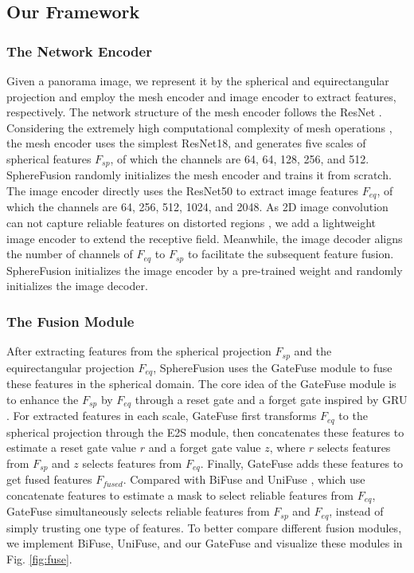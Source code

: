 \subsection{Our Framework}
\label{sec:pipeline}

\subsubsection{The Network Encoder}
Given a panorama image, we represent it by the spherical and equirectangular projection and employ the mesh encoder and image encoder to extract features, respectively.
The network structure of the mesh encoder follows the ResNet \cite{he2016deep}. Considering the extremely high computational complexity of mesh operations \cite{hu2021subdivision,yan2022spheredepth}, the mesh encoder uses the simplest ResNet18, and generates five scales of spherical features $F_{sp}$, of which the channels are 64, 64, 128, 256, and 512. SphereFusion randomly initializes the mesh encoder and trains it from scratch.
The image encoder directly uses the ResNet50 to extract image features $F_{eq}$, of which the channels are 64, 256, 512, 1024, and 2048. 
As 2D image convolution can not capture reliable features on distorted regions \cite{zioulis2018omnidepth}, we add a lightweight image encoder to extend the receptive field. Meanwhile, the image decoder aligns the number of channels of $F_{eq}$ to $F_{sp}$ to facilitate the subsequent feature fusion. SphereFusion initializes the image encoder by a pre-trained weight and randomly initializes the image decoder.





\subsubsection{The Fusion Module}

After extracting features from the spherical projection $F_{sp}$ and the equirectangular projection $F_{eq}$, SphereFusion uses the GateFuse module to fuse these features in the spherical domain. 
The core idea of the GateFuse module is to enhance the $F_{sp}$ by $F_{eq}$ through a reset gate and a forget gate inspired by GRU \cite{cho2014learning}.
For extracted features in each scale, GateFuse first transforms $F_{eq}$ to the spherical projection through the E2S module, then concatenates these features to estimate a reset gate value $r$ and a forget gate value $z$, where $r$ selects features from $F_{sp}$ and $z$ selects features from $F_{eq}$. Finally, GateFuse adds these features to get fused features $F_{fused}$.
Compared with BiFuse \cite{wang2020bifuse} and UniFuse \cite{jiang2021unifuse}, which use concatenate features to estimate a mask to select reliable features from $F_{eq}$, GateFuse simultaneously selects reliable features from $F_{sp}$ and $F_{eq}$, instead of simply trusting one type of features.
To better compare different fusion modules, we implement BiFuse, UniFuse, and our GateFuse and visualize these modules in Fig. \ref{fig:fuse}.




